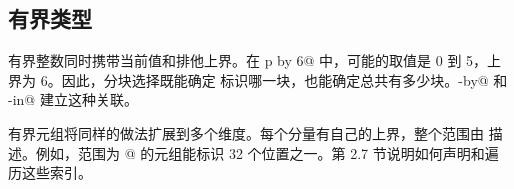 \subsection*{有界类型}

有界整数同时携带当前值和排他上界。在 \co@parallel p by 6@ 中，可能的取值是 0 到 5，上界为 6。因此，分块选择既能确定 \co@p@ 标识哪一块，也能确定总共有多少块。\co@parallel-by@ 和 \co@with-in@ 建立这种关联。

有界元组将同样的做法扩展到多个维度。每个分量有自己的上界，整个范围由 \co@mdspan@ 描述。例如，范围为 \co@[4, 8]@ 的元组能标识 32 个位置之一。第 2.7 节说明如何声明和遍历这些索引。

